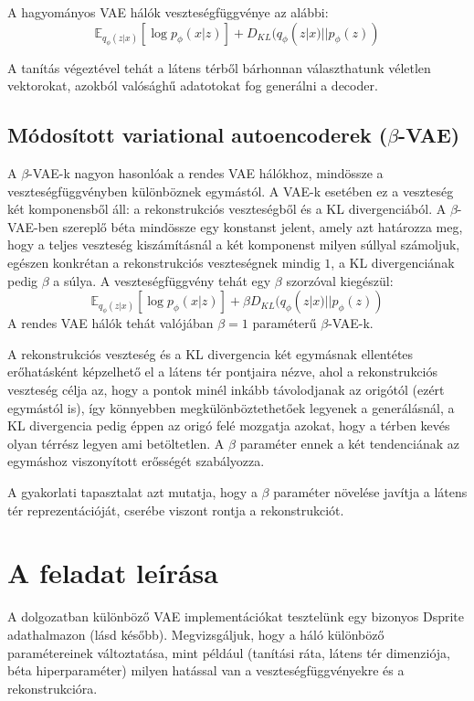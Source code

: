 A hagyományos VAE hálók veszteségfüggvénye az alábbi:
$$ \mathbb{E}_{q_\phi(z|x)} [\log p_\phi(x|z)] + D_{KL}(q_\phi(z|x)||p_\phi(z))$$

A tanítás végeztével tehát a látens térből bárhonnan választhatunk véletlen vektorokat, azokból valósághű adatotokat fog generálni a decoder.

\section{Módosított variational autoencoderek ($\beta$-VAE)}

A $\beta$-VAE-k \cite{bvae} nagyon hasonlóak a rendes VAE hálókhoz, mindössze a veszteségfüggvényben különböznek egymástól. A VAE-k esetében ez a veszteség két komponensből áll: a rekonstrukciós veszteségből és a KL divergenciából. A $\beta$-VAE-ben szereplő béta mindössze egy konstanst jelent, amely azt határozza meg, hogy a teljes veszteség kiszámításnál a két komponenst milyen súllyal számoljuk, egészen konkrétan a rekonstrukciós veszteségnek mindig $1$, a KL divergenciának pedig $\beta$ a súlya. A veszteségfüggvény tehát egy $\beta$ szorzóval kiegészül:
$$ \mathbb{E}_{q_\phi(z|x)} [\log p_\phi(x|z)] + \beta D_{KL}(q_\phi(z|x)||p_\phi(z))$$
A rendes VAE hálók tehát valójában $\beta=1$ paraméterű $\beta$-VAE-k.

A rekonstrukciós veszteség és a KL divergencia két egymásnak ellentétes erőhatásként képzelhető el a látens tér pontjaira nézve, ahol a rekonstrukciós veszteség célja az, hogy a pontok minél inkább távolodjanak az origótól (ezért egymástól is), így könnyebben megkülönböztethetőek legyenek a generálásnál, a KL divergencia pedig éppen az origó felé mozgatja azokat, hogy a térben kevés olyan térrész legyen ami betöltetlen. A $\beta$ paraméter ennek a két tendenciának az egymáshoz viszonyított erősségét szabályozza.

A gyakorlati tapasztalat azt mutatja, hogy a $\beta$ paraméter növelése javítja a látens tér reprezentációját, cserébe viszont rontja a rekonstrukciót.

\chapter{A feladat leírása}

A dolgozatban különböző VAE implementációkat tesztelünk egy bizonyos Dsprite adathalmazon (lásd később). Megvizsgáljuk, hogy a háló különböző paramétereinek változtatása, mint például (tanítási ráta, látens tér dimenziója, béta hiperparaméter) milyen hatással van a veszteségfüggvényekre és a rekonstrukcióra.

